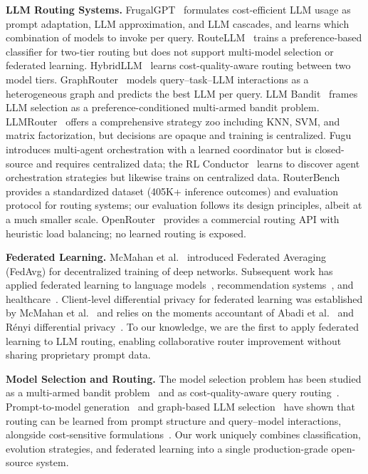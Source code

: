 \documentclass[11pt,a4paper]{article}
\begin{document}
\textbf{LLM Routing Systems.}
FrugalGPT~\cite{frugalgpt2023} formulates cost-efficient LLM usage as prompt adaptation, LLM approximation, and LLM cascades, and learns which combination of models to invoke per query.
RouteLLM~\cite{routellm2024} trains a preference-based classifier for two-tier routing but does not support multi-model selection or federated learning.
HybridLLM~\cite{hybridllm2024} learns cost-quality-aware routing between two model tiers.
GraphRouter~\cite{graphrouter2024} models query--task--LLM interactions as a heterogeneous graph and predicts the best LLM per query.
LLM Bandit~\cite{llmbandit2025} frames LLM selection as a preference-conditioned multi-armed bandit problem.
LLMRouter~\cite{llmrouter2024} offers a comprehensive strategy zoo including KNN, SVM, and matrix factorization, but decisions are opaque and training is centralized.
Fugu~\cite{fugu2026} introduces multi-agent orchestration with a learned coordinator but is closed-source and requires centralized data; the RL Conductor~\cite{conductor2026} learns to discover agent orchestration strategies but likewise trains on centralized data.
RouterBench~\cite{routerbench2024} provides a standardized dataset (405K+ inference outcomes) and evaluation protocol for routing systems; our evaluation follows its design principles, albeit at a much smaller scale.
OpenRouter~\cite{openrouter} provides a commercial routing API with heuristic load balancing; no learned routing is exposed.

\textbf{Federated Learning.}
McMahan et al.~\cite{mcmahan2017} introduced Federated Averaging (FedAvg) for decentralized training of deep networks.
Subsequent work has applied federated learning to language models~\cite{fednlp2021}, recommendation systems~\cite{fedrec2020}, and healthcare~\cite{fedhealth2021}.
Client-level differential privacy for federated learning was established by McMahan et al.~\cite{mcmahan2018} and relies on the moments accountant of Abadi et al.~\cite{abadi2016} and R\'enyi differential privacy~\cite{mironov2017}.
To our knowledge, we are the first to apply federated learning to LLM routing, enabling collaborative router improvement without sharing proprietary prompt data.

\textbf{Model Selection and Routing.}
The model selection problem has been studied as a multi-armed bandit problem~\cite{llmbandit2025} and as cost-quality-aware query routing~\cite{hybridllm2024}.
Prompt-to-model generation~\cite{prompt2model2023} and graph-based LLM selection~\cite{graphrouter2024} have shown that routing can be learned from prompt structure and query--model interactions, alongside cost-sensitive formulations~\cite{costrouter2024}.
Our work uniquely combines classification, evolution strategies, and federated learning into a single production-grade open-source system.
\end{document}

